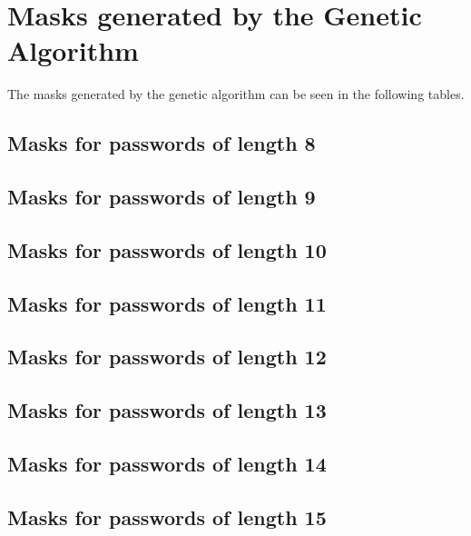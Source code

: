 \documentclass[sigconf,authordraft]{acmart}
\begin{document}



\appendix

\section{Masks generated by the Genetic Algorithm}

The masks generated by the genetic algorithm can be seen in the following tables.

\subsection{Masks for passwords of length 8}


\subsection{Masks for passwords of length 9}


\subsection{Masks for passwords of length 10}


\subsection{Masks for passwords of length 11}


\subsection{Masks for passwords of length 12}


\subsection{Masks for passwords of length 13}


\subsection{Masks for passwords of length 14}


\subsection{Masks for passwords of length 15}

\end{document}
